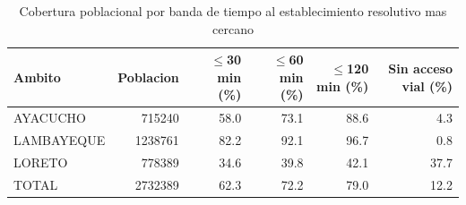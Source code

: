 \begin{table}[htbp]
\caption{Cobertura poblacional por banda de tiempo al establecimiento resolutivo mas cercano}
\label{tab:bandas}
\begin{tabular}{lrrrrr}
\toprule
Ambito & Poblacion & $\leq$30 min (\%) & $\leq$60 min (\%) & $\leq$120 min (\%) & Sin acceso vial (\%) \\
\midrule
AYACUCHO & 715240 & 58.0 & 73.1 & 88.6 & 4.3 \\
LAMBAYEQUE & 1238761 & 82.2 & 92.1 & 96.7 & 0.8 \\
LORETO & 778389 & 34.6 & 39.8 & 42.1 & 37.7 \\
TOTAL & 2732389 & 62.3 & 72.2 & 79.0 & 12.2 \\
\bottomrule
\end{tabular}
\end{table}
